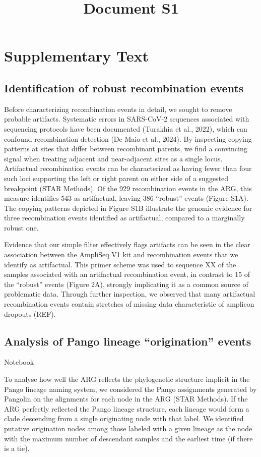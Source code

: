 \documentclass[12pt,letterpaper]{article}
\title{Document S1}
\date{}
\makeatletter
\renewcommand{\maketitle}{\bgroup\setlength{\parindent}{0pt}
\begin{flushleft}
  \textbf{\@title}

  \@author
\end{flushleft}\egroup}
\makeatother
\begin{document}
\maketitle

\section*{Supplementary Text}

\subsection*{Identification of robust recombination events}
Before characterizing recombination events in detail, we sought to remove probable artifacts.
Systematic errors in SARS-CoV-2 sequences associated with sequencing protocols have been documented (Turakhia et al., 2022),
which can confound recombination detection (De Maio et al., 2024).
By inspecting copying patterns at sites that differ between recombinant parents,
we find a convincing signal when treating adjacent and near-adjacent sites as a single locus.
Artifactual recombination events can be characterized as
having fewer than four such loci supporting the left or right parent on either side of a suggested breakpoint (STAR Methods).
Of the 929 recombination events in the ARG, this measure identifies 543 as artifactual,
leaving 386 “robust” events (Figure S1A).
The copying patterns depicted in Figure S1B illustrate the genomic evidence for
three recombination events identified as artifactual, compared to a marginally robust one.

Evidence that our simple filter effectively flags artifacts can be seen in the clear association between
the AmpliSeq V1 kit and recombination events that we identify as artifactual.
This primer scheme was used to sequence XX of the samples associated with an artifactual recombination event,
in contrast to 15 of the “robust” events (Figure 2A), strongly implicating it as a common source of problematic data.
Through further inspection, we observed that many artifactual recombination events
contain stretches of missing data characteristic of amplicon dropouts (REF).

\subsection*{Analysis of Pango lineage ``origination'' events}
Notebook

To analyse how well the ARG reflects the phylogenetic structure implicit in the Pango lineage naming system,
we considered the Pango assignments generated by Pangolin on the alignments for each node in the ARG (STAR Methods).
If the ARG perfectly reflected the Pango lineage structure,
each lineage would form a clade descending from a single originating node with that label.
We identified putative origination nodes among those labeled with a given lineage as the node
with the maximum number of descendant samples and the earliest time (if there is a tie).
\end{document}
